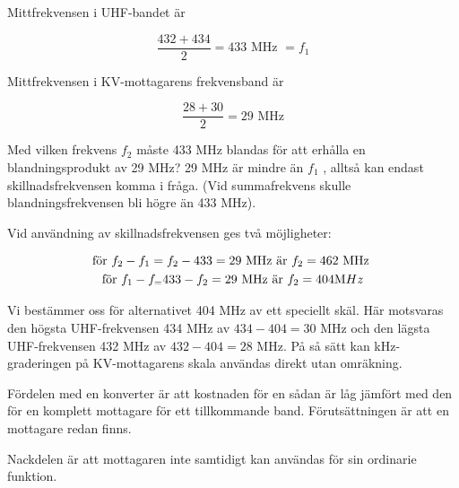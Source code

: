 Mittfrekvensen i UHF-bandet är

\[\frac{432+434}{2} = 433\text{ MHz } = f_1\]

Mittfrekvensen i KV-mottagarens frekvensband är

\[\frac{28 + 30}{2} = 29\text{ MHz}\]

Med vilken frekvens \(f_2\) måste 433 MHz blandas för att erhålla en
blandningsprodukt av 29 MHz? 29 MHz är mindre än \(f_1\) , alltså kan
endast skillnadsfrekvensen komma i fråga. (Vid summafrekvens skulle
blandningsfrekvensen bli högre än 433 MHz).

Vid användning av skillnadsfrekvensen ges två möjligheter:

\begin{gather*}
  \text{för }f_2 - f_1 = f_2 - 433 = 29\text{ MHz är }f_2 = 462\text{ MHz} \\
  \text{för }f_1 - f_ = 433 - f_2 = 29\text{ MHz är }f_2 = 404{\text MHz} \\
\end{gather*}

Vi bestämmer oss för alternativet 404 MHz av ett speciellt skäl. Här
motsvaras den högsta UHF-frekvensen 434 MHz av \(434 - 404 = 30\) MHz
och den lägsta UHF-frekvensen 432 MHz av \(432 - 404 = 28\) MHz. På så
sätt kan kHz-graderingen på KV-mottagarens skala användas direkt utan
omräkning.

Fördelen med en konverter är att kostnaden för en sådan är låg jämfört
med den för en komplett mottagare för ett tillkommande
band. Förutsättningen är att en mottagare redan finns.

Nackdelen är att mottagaren inte samtidigt kan användas för sin
ordinarie funktion.
